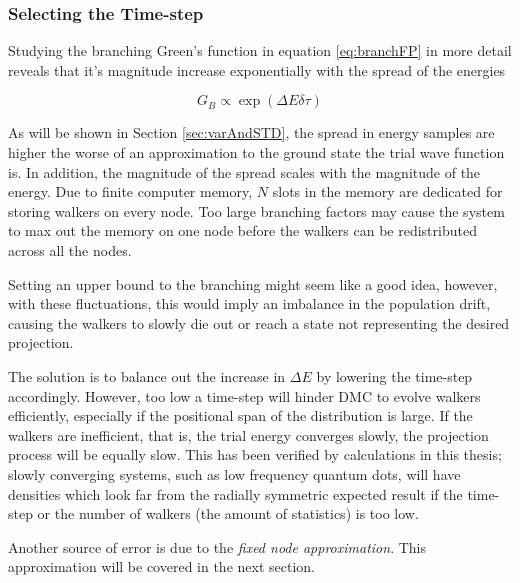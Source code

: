 \subsubsection{Selecting the Time-step}

Studying the branching Green's function in equation \ref{eq:branchFP} in more detail reveals that it's magnitude increase exponentially with the spread of the energies

\begin{equation}
G_B \propto \exp{\left(\Delta E\delta\tau\right)} 
\end{equation}

As will be shown in Section \ref{sec:varAndSTD}, the spread in energy samples are higher the worse of an approximation to the ground state the trial wave function is. In addition, the magnitude of the spread scales with the magnitude of the energy. Due to finite computer memory, $N$ slots in the memory are dedicated for storing walkers on every node. Too large branching factors may cause the system to max out the memory on one node before the walkers can be redistributed across all the nodes. 

Setting an upper bound to the branching might seem like a good idea, however, with these fluctuations, this would imply an imbalance in the population drift, causing the walkers to slowly die out or reach a state not representing the desired projection.

The solution is to balance out the increase in $\Delta E$ by lowering the time-step accordingly. However, too low a time-step will hinder DMC to evolve walkers efficiently, especially if the positional span of the distribution is large. If the walkers are inefficient, that is, the trial energy converges slowly, the projection process will be equally slow. This has been verified by calculations in this thesis; slowly converging systems, such as low frequency quantum dots, will have densities which look far from the radially symmetric expected result if the time-step or the number of walkers (the amount of statistics) is too low.

Another source of error is due to the \textit{fixed node approximation}. This approximation will be covered in the next section.

